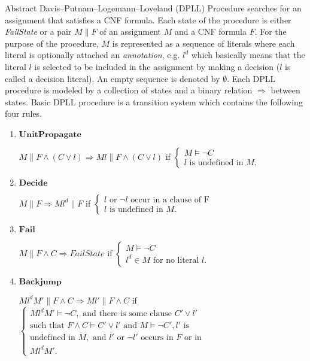 Abstract Davis–Putnam–Logemann–Loveland (DPLL) Procedure \cite{Nieuwenhuis05abstractdpll} searches for an assignment that satisfies a CNF formula. Each state of the procedure is either \emph{FailState} or a pair $M \parallel  F$ of an assignment $M$ and a CNF formula $F$. For the purpose of the procedure, $M$ is represented as a sequence of literals where each literal is optionally attached an \emph{annotation}, e.g. $l^d$ which basically means that the literal $l$ is selected to be included in the assignment by making a decision ($l$ is called a decision literal). An empty sequence is denoted by $\emptyset$. Each DPLL procedure is modeled by a collection of states and a binary relation $\Longrightarrow$ between states. Basic DPLL procedure is a transition system which contains the following four rules.
\begin{enumerate}
\item $\mathbf{UnitPropagate}$

$M \parallel F \wedge (C \vee l) \Longrightarrow Ml \parallel F \wedge (C \vee l)$ if $\left\{ 
  \begin{array}{l}
    M \models \neg C \\
    l\text{ is undefined in }M.
  \end{array} \right.$
  
\item $\mathbf{Decide}$

$M \parallel F \Longrightarrow Ml^d \parallel F$ if $\left\{ 
  \begin{array}{l}
    l \text{ or } \neg l \text{ occur in a clause of F} \\
    l\text{ is undefined in }M.
  \end{array} \right.$

\item $\mathbf{Fail}$

$M \parallel F \wedge C \Longrightarrow FailState$ if $\left\{ 
  \begin{array}{l}
    M \models \neg C \\
    l^d \in M \text{ for no literal }l.
  \end{array} \right.$  
  
\item $\mathbf{Backjump}$

$Ml^dM' \parallel F \wedge C \Longrightarrow Ml' \parallel F \wedge C$ if $\left\{ 
  \begin{array}{l}
    Ml^dM' \models \neg C,\text{ and there is some clause } C' \vee l'\\ 
    \text{such that }
    F \wedge C \models C' \vee l'
    \text{ and }M \models \neg C', l' \text{ is }\\
    \text{undefined in } M, \text{ and } l' \text{ or } \neg l' \text{ occurs in } F \text{ or in } \\Ml^dM'.
  \end{array} \right.$  
\end{enumerate}

